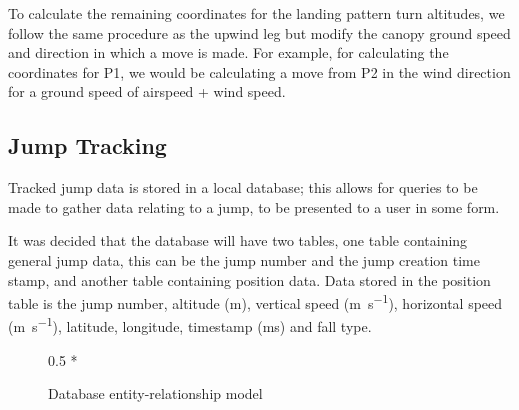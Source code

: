To calculate the remaining coordinates for the landing pattern turn altitudes, we follow the same procedure as the upwind leg but modify the canopy ground speed and direction in which a move is made. For example, for calculating the coordinates for P1, we would be calculating a move from P2 in the wind direction for a ground speed of airspeed + wind speed.

\subsection{Jump Tracking}
Tracked jump data is stored in a local database; this allows for queries to be made to gather data relating to a jump, to be presented to a user in some form.

It was decided that the database will have two tables, one table containing general jump data, this can be the jump number and the jump creation time stamp, and another table containing position data. Data stored in the position table is the jump number, altitude (\si{\metre}), vertical speed (\si{\metre\per\second}), horizontal speed (\si{\metre\per\second}), latitude, longitude, timestamp (\si{\milli\second}) and fall type.

\begin{figure}[ht]
  \centering
  \begin{scaletikzpicturetowidth}{0.5 * \linewidth}
  \end{scaletikzpicturetowidth}
  \caption{Database entity-relationship model}\label{fig:database-relations}
\end{figure}

